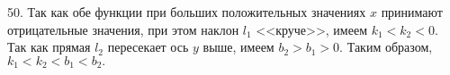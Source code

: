 50. Так как обе функции при больших положительных значениях $x$ принимают отрицательные значения, при этом наклон $l_1$ <<круче>>, имеем $k_1<k_2<0.$
Так как прямая $l_2$ пересекает ось $y$ выше, имеем $b_2>b_1>0.$ Таким образом, $k_1<k_2<b_1<b_2.$\\
